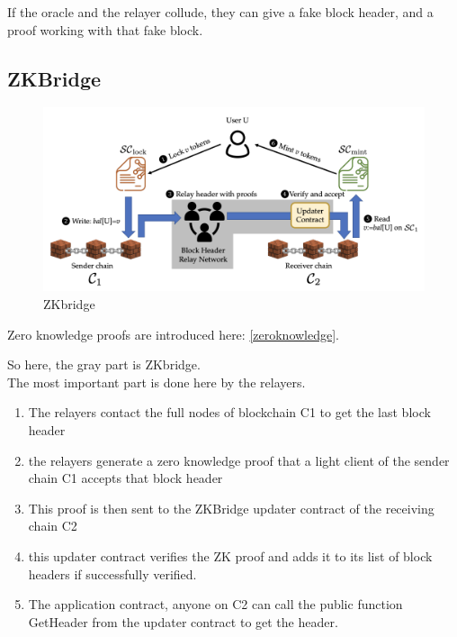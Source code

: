 If the oracle and the relayer collude, they can give a fake block header, and a proof working with that fake block. 


\subsection{ZKBridge \cite{xie2022zkbridge}}
\begin{figure}[H]
    \centering
\includegraphics[width=0.8\linewidth]{interoperability/zkbridge.png}
    \caption{ZKbridge}
    \label{fig:zkbridge}
\end{figure}

Zero knowledge proofs are introduced here: \ref{zeroknowledge}.

So here, the gray part is ZKbridge.
\\The most important part is done here by the relayers. 
\begin{enumerate}
    \item The relayers contact the full nodes of blockchain C1 to get the last block header%
    \item the relayers generate a zero knowledge proof that a light client of the sender chain C1 accepts that block header
    \item This proof is then sent to the ZKBridge updater contract of the receiving chain C2
    \item this updater contract verifies the ZK proof and adds it to its list of block headers if successfully verified.
    \item The application contract, anyone on C2 can call the public function GetHeader from the updater contract to get the header. 
\end{enumerate}

